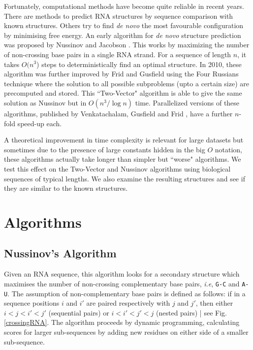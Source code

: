 \documentclass[journal]{IEEEtran}
\begin{document}
Fortunately, computational methods have become quite reliable in recent years. There are methods to predict RNA structures by sequence comparison with known structures. Others try to find \textit{de novo} the most favourable configuration by minimising free energy. An early algorithm for \textit{de novo} structure prediction was proposed by Nussinov and Jacobson \cite{Nussinov1980}. This works by maximizing the number of non-crossing base pairs in a single RNA strand. For a sequence of length $n$, it takes $O(n^3$) steps to deterministically find an optimal structure.  In 2010, these algorithm was further improved by Frid and Gusfield \cite{Frid2010} using the Four Russians technique where the solution to all possible subproblems (upto a certain size) are precomputed and stored. This ``Two-Vector" algorithm is able to give the same solution as Nussinov but in $O(n^3/\log{n})$ time. Parallelized versions of these algorithms, published by Venkatachalam, Gusfield and Frid \cite{Venkatachalam2014}, have a further $n$-fold speed-up each.

A theoretical improvement in time complexity is relevant for large datasets but sometimes due to the presence of large constants hidden in the big $O$ notation, these algorithms actually take longer than simpler but ``worse" algorithms. We test this effect on the Two-Vector and Nussinov algorithms using biological sequences of typical lengths. We also examine the resulting structures and see if they are similar to the known structures.

\section{Algorithms}
\subsection{Nussinov's Algorithm}
Given an RNA sequence, this algorithm looks for a secondary structure which maximises the number of non-crossing complementary base pairs, \textit{i.e}, \texttt{G-C} and \texttt{A-U}. The assumption of non-complementary base pairs is defined as follows: if in a sequence positions $i$ and $i'$ are paired respectively with $j$ and $j'$, then either $i<j<i'<j'$ (sequential pairs) or $i<i'<j'<j$ (nested pairs) | see Fig. \ref{crossingRNA}. The algorithm proceeds by dynamic programming, calculating scores for larger sub-sequences by adding new residues on either side of a smaller sub-sequence.
\end{document}
